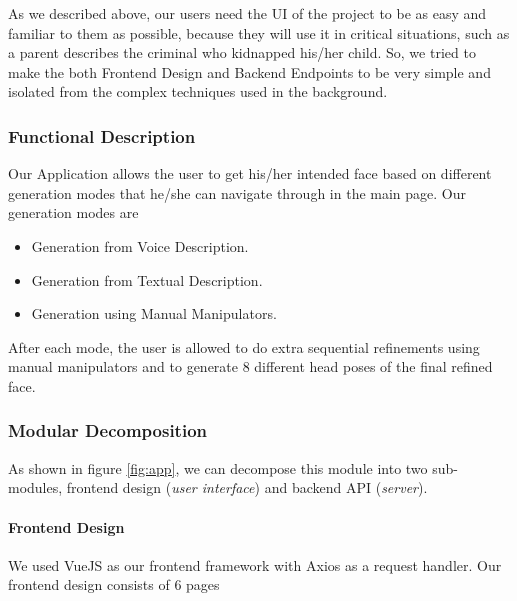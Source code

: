 As we described above, our users need the UI of the project to be as easy and familiar to them as possible, because they will use it in critical situations, such as a parent describes the criminal who kidnapped his/her child. So, we tried to make the both Frontend Design and Backend Endpoints to be very simple and isolated from the complex techniques used in the background.

\subsubsection{Functional Description}
Our Application allows the user to get his/her intended face based on different generation modes that he/she can navigate through in the main page. Our generation modes are
\begin{itemize}
    \item Generation from Voice Description.
    \item Generation from Textual Description.
    \item Generation using Manual Manipulators.
\end{itemize}
After each mode, the user is allowed to do extra sequential refinements using manual manipulators and to generate 8 different head poses of the final refined face.

\subsubsection{Modular Decomposition}
As shown in figure \ref{fig:app}, we can decompose this module into two sub-modules, frontend design (\emph{user interface}) and backend API (\emph{server}).

\paragraph{Frontend Design}
We used VueJS as our frontend framework with Axios as a request handler. Our frontend design consists of 6 pages

